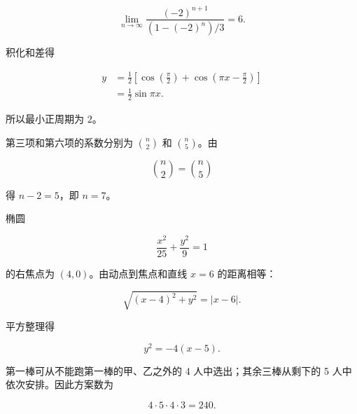 \begin{answer}
\nopagebreak[4]
\[
\lim_{n\to\infty}
\frac{(-2)^{n+1}}{(1-(-2)^n)/3}
=6.
\]


积化和差得

\nopagebreak[4]
\[
\begin{aligned}
y
&=\frac12\left[
\cos\left(\frac\pi2\right)
+\cos\left(\pi x-\frac\pi2\right)\right]\\
&=\frac12\sin\pi x.
\end{aligned}
\]

所以最小正周期为 $2$。


第三项和第六项的系数分别为 $\binom n2$ 和 $\binom n5$。由

\nopagebreak[4]
\[
\binom n2=\binom n5
\]

得 $n-2=5$，即 $n=7$。


椭圆

\nopagebreak[4]
\[
\frac{x^2}{25}+\frac{y^2}{9}=1
\]

的右焦点为 $(4,0)$。由动点到焦点和直线 $x=6$ 的距离相等：

\nopagebreak[4]
\[
\sqrt{(x-4)^2+y^2}=|x-6|.
\]

平方整理得

\nopagebreak[4]
\[
y^2=-4(x-5).
\]


第一棒可从不能跑第一棒的甲、乙之外的 4 人中选出；其余三棒从剩下的 5 人中依次安排。因此方案数为

\nopagebreak[4]
\[
4\cdot5\cdot4\cdot3=240.
\]











\end{answer}
